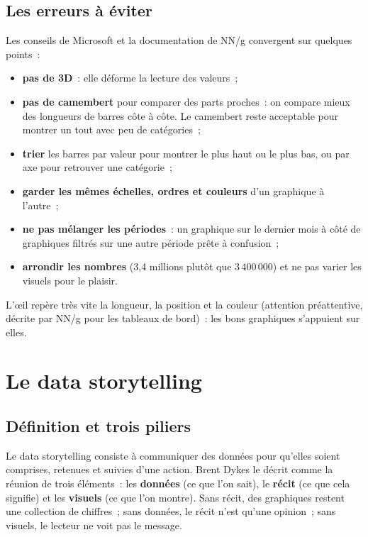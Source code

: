 \subsection{Les erreurs à éviter}

\noindent Les conseils de Microsoft et la documentation de NN/g convergent sur quelques points~:
\begin{itemize}
	\item \textbf{pas de 3D}~: elle déforme la lecture des valeurs~;
	\item \textbf{pas de camembert} pour comparer des parts proches~: on compare mieux des longueurs de barres côte à côte. Le camembert reste acceptable pour montrer un tout avec peu de catégories~;
	\item \textbf{trier} les barres par valeur pour montrer le plus haut ou le plus bas, ou par axe pour retrouver une catégorie~;
	\item \textbf{garder les mêmes échelles, ordres et couleurs} d'un graphique à l'autre~;
	\item \textbf{ne pas mélanger les périodes}~: un graphique sur le dernier mois à côté de graphiques filtrés sur une autre période prête à confusion~;
	\item \textbf{arrondir les nombres} (3,4 millions plutôt que 3\,400\,000) et ne pas varier les visuels pour le plaisir.
\end{itemize}

\noindent L'œil repère très vite la longueur, la position et la couleur (attention préattentive, décrite par NN/g pour les tableaux de bord)~: les bons graphiques s'appuient sur elles.

\section{Le data storytelling}\label{sec:storytelling}

\subsection{Définition et trois piliers}

\noindent Le data storytelling consiste à communiquer des données pour qu'elles soient comprises, retenues et suivies d'une action. Brent Dykes le décrit comme la réunion de trois éléments~: les \textbf{données} (ce que l'on sait), le \textbf{récit} (ce que cela signifie) et les \textbf{visuels} (ce que l'on montre). Sans récit, des graphiques restent une collection de chiffres~; sans données, le récit n'est qu'une opinion~; sans visuels, le lecteur ne voit pas le message.

